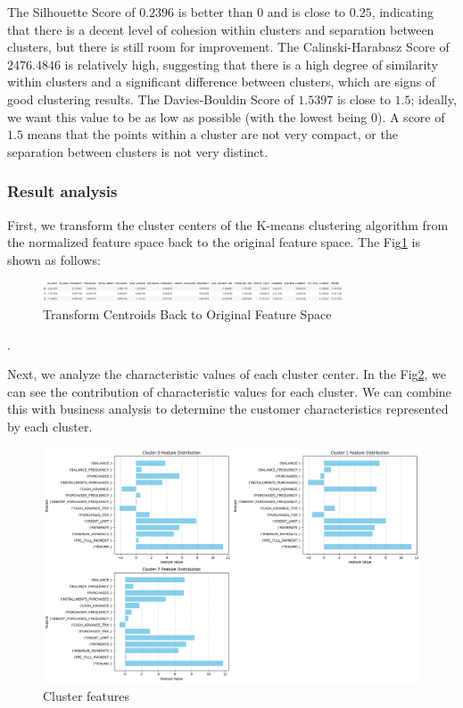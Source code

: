 \documentclass{article}
\begin{document}
The Silhouette Score of \(0.2396\) is better than \(0\) and is close to \(0.25\), indicating that there is a decent level of cohesion within clusters and separation between clusters, but there is still room for improvement. The Calinski-Harabasz Score of \(2476.4846\) is relatively high, suggesting that there is a high degree of similarity within clusters and a significant difference between clusters, which are signs of good clustering results. The Davies-Bouldin Score of \(1.5397\) is close to \(1.5\); ideally, we want this value to be as low as possible (with the lowest being \(0\)). A score of \(1.5\) means that the points within a cluster are not very compact, or the separation between clusters is not very distinct.
\subsubsection{Result analysis}
First, we transform the cluster centers of the K-means clustering algorithm from the normalized feature space back to the original feature space. The Fig\ref{fig:result1} is shown as follows:
\begin{figure}[hbt!]
    \centering
    \includegraphics[width=0.8\textwidth]{fig/zya/result1.png}
    \caption{Transform Centroids Back to Original Feature Space}
    \label{fig:result1}  %
\end{figure}
.\par
Next, we analyze the characteristic values of each cluster center. In the Fig\ref{fig:result2}, we can see the contribution of characteristic values for each cluster. We can combine this with business analysis to determine the customer characteristics represented by each cluster.
\begin{figure}[hbt!]
    \centering
    \includegraphics[width=1.2\textwidth]{fig/zya/result2.png}
    \caption{Cluster features}
    \label{fig:result2}  %
\end{figure}
\end{document}

